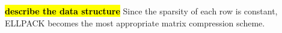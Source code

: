 \documentclass[10pt,conference,compsocconf]{IEEEtran}
\def\ttt#1{{\tt #1}}
\newcommand{\todo}[1]{{\color{red}\textbf{\hl{#1}}\xspace}}
\begin{document}
%
%
%
%
%



\todo{describe the data structure} Since the sparsity of each row is
constant, ELLPACK becomes the most appropriate matrix
compression scheme.

\end{document}
